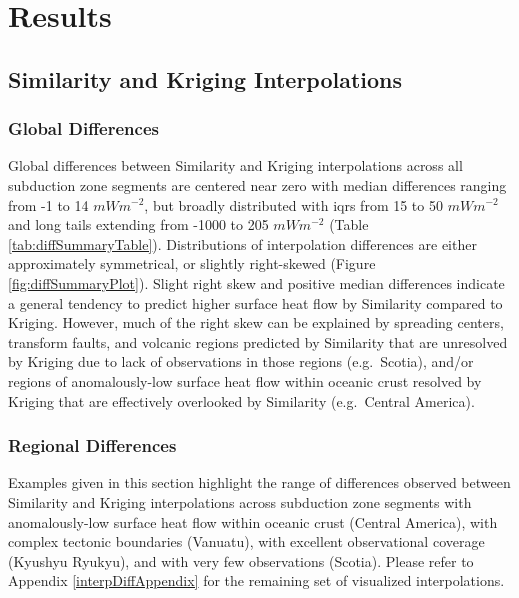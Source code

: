 \hypertarget{chpt3Results}{%
\section{Results}\label{chpt3Results}}

\hypertarget{interpDiff}{%
\subsection{Similarity and Kriging Interpolations}\label{interpDiff}}

\hypertarget{global-differences}{%
\subsubsection{Global Differences}\label{global-differences}}

Global differences between Similarity and Kriging interpolations across all subduction zone segments are centered near zero with median differences ranging from -1 to 14 \(mWm^{-2}\), but broadly distributed with \glspl{iqr} from 15 to 50 \(mWm^{-2}\) and long tails extending from -1000 to 205 \(mWm^{-2}\) (Table \ref{tab:diffSummaryTable}). Distributions of interpolation differences are either approximately symmetrical, or slightly right-skewed (Figure \ref{fig:diffSummaryPlot}). Slight right skew and positive median differences indicate a general tendency to predict higher surface heat flow by Similarity compared to Kriging. However, much of the right skew can be explained by spreading centers, transform faults, and volcanic regions predicted by Similarity that are unresolved by Kriging due to lack of observations in those regions (e.g.~Scotia), and/or regions of anomalously-low surface heat flow within oceanic crust resolved by Kriging that are effectively overlooked by Similarity (e.g.~Central America).

\hypertarget{regional-differences}{%
\subsubsection{Regional Differences}\label{regional-differences}}

Examples given in this section highlight the range of differences observed between Similarity and Kriging interpolations across subduction zone segments with anomalously-low surface heat flow within oceanic crust (Central America), with complex tectonic boundaries (Vanuatu), with excellent observational coverage (Kyushyu Ryukyu), and with very few observations (Scotia). Please refer to Appendix \ref{interpDiffAppendix} for the remaining set of visualized interpolations.


